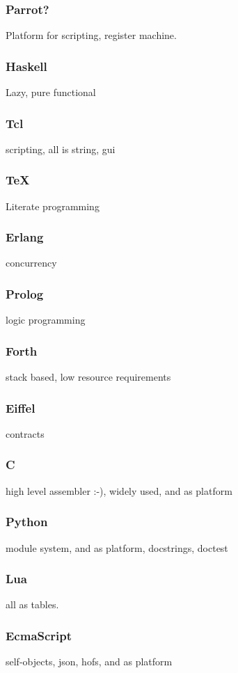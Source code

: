 \subsubsection{Parrot?}
Platform for scripting, register machine.
\subsubsection{Haskell}
Lazy, pure functional
\subsubsection{Tcl}
scripting, all is string, gui
\subsubsection{TeX}
Literate programming
\subsubsection{Erlang}
concurrency
\subsubsection{Prolog}
logic programming
\subsubsection{Forth}
stack based, low resource requirements
\subsubsection{Eiffel}
contracts
\subsubsection{C}
high level assembler :-), widely used, and as platform
\subsubsection{Python}
module system, and as platform, docstrings, doctest
\subsubsection{Lua}
all as tables.
\subsubsection{EcmaScript}
self-objects, json, hofs, and as platform


